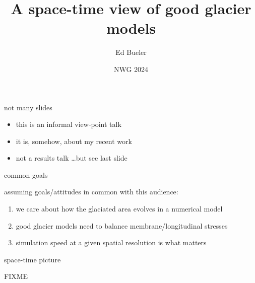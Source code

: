 \documentclass[10pt,dvipsnames]{beamer}
\title{A space-time view of good glacier models}
\date{NWG 2024}
\author{Ed Bueler}
\institute{University of Alaska Fairbanks}
\begin{document}
\graphicspath{{figs/}}

\maketitle





\begin{frame}{not many slides}

\begin{itemize}
\item this is an informal view-point talk
\item it is, somehow, about my recent work
\item<2> not a results talk \hfill \dots but see last slide
\end{itemize}
\end{frame}


\begin{frame}{common goals}

assuming goals/attitudes in common with this audience:
\begin{enumerate}
\item we care about how the glaciated area evolves in a numerical model
\item good glacier models need to balance membrane/longitudinal stresses
\item simulation speed at a given spatial resolution is what matters
\end{enumerate}
\end{frame}


\begin{frame}{space-time picture}

\begin{center}
FIXME%
\end{center}
\end{frame}
\end{document}
